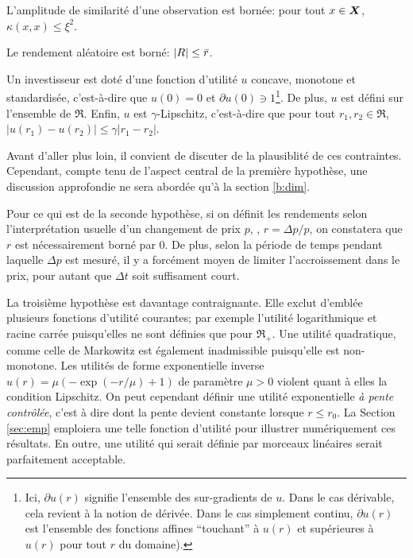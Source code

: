 \begin{assumption}
  L'amplitude de similarité d'une observation est bornée: pour tout $x \in \bm{X}$,
  $\kappa(x,x) \leq \xi^2$.
\end{assumption}
\begin{assumption}
  Le rendement aléatoire est borné: $|R| \leq \bar r$.
\end{assumption}
\begin{assumption}
  \label{hyp:lip}
  Un investisseur est doté d'une fonction d'utilité $u$ concave, monotone et standardisée,
  c'est-à-dire que $u(0) = 0$ et $\partial u(0) \ni 1$\footnote{Ici, $\partial u(r)$ signifie l'ensemble
    des sur-gradients de $u$. Dans le cas dérivable, cela revient à la notion de
    dérivée. Dans le cas simplement continu, $\partial u(r)$ est l'ensemble des fonctions affines
    ``touchant'' à $u(r)$ et supérieures à $u(r)$ pour tout $r$ du domaine).}. De plus,
  $u$ est défini sur l'ensemble de $\Re$. Enfin, $u$ est $\gamma$-Lipschitz, c'est-à-dire que
  pour tout $r_1,r_2 \in \Re$, $|u(r_1) - u(r_2)| \leq \gamma|r_1-r_2|$.
\end{assumption}

Avant d'aller plus loin, il convient de discuter de la plausiblité de ces
contraintes. Cependant, compte tenu de l'aspect central de la première hypothèse, une
discussion approfondie ne sera abordée qu'à la section \ref{b:dim}.

Pour ce qui est de la seconde hypothèse, si on définit les rendements selon
l'interprétation usuelle d'un changement de prix $p$, \ie, $r = \Delta p/p$, on constatera que
$r$ est nécessairement borné par 0. De plus, selon la période de temps pendant laquelle
$\Delta p$ est mesuré, il y a forcément moyen de limiter l'accroissement dans le prix, pour
autant que $\Delta t$ soit suffisament court.

La troisième hypothèse est davantage contraignante. Elle exclut d'emblée plusieurs
fonctions d'utilité courantes; par exemple l'utilité logarithmique et racine carrée
puisqu'elles ne sont définies que pour $\Re_{+}$. Une utilité quadratique, comme celle de
Markowitz est également inadmissible puisqu'elle est non-monotone. Les utilités de forme
exponentielle inverse $u(r) = \mu(-\exp(-r/\mu)+1)$ de paramètre $\mu > 0$ violent quant à elles
la condition Lipschitz. On peut cependant définir une utilité exponentielle \textit{à
  pente contrôlée}, c'est à dire dont la pente devient constante lorsque $r \leq r_0$. La
Section \ref{sec:emp} emploiera une telle fonction d'utilité pour illustrer numériquement
ces résultats. En outre, une utilité qui serait définie par morceaux linéaires serait
parfaitement acceptable. 


